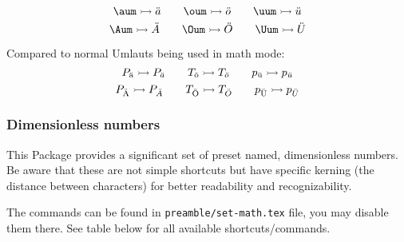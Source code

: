         \[
            \verb|\aum| \rightarrowtail  \aum \qquad
            \verb|\oum| \rightarrowtail  \oum \qquad
            \verb|\uum| \rightarrowtail  \uum
        \]
        \[
            \verb|\Aum| \rightarrowtail  \Aum \qquad
            \verb|\Oum| \rightarrowtail  \Oum \qquad
            \verb|\Uum| \rightarrowtail  \Uum
        \]

        Compared to normal Umlauts being used in math mode:
        \[
            P_{\ddot{\mathrm{a}}} \rightarrowtail P_{\ddot{a}} \qquad
            T_{\ddot{\mathrm{o}}} \rightarrowtail T_{\ddot{o}} \qquad
            p_{\ddot{\mathrm{u}}} \rightarrowtail p_{\ddot{u}}
        \]
        \[
            P_{\ddot{\mathrm{A}}} \rightarrowtail P_{\ddot{A}} \qquad
            T_{\ddot{\mathrm{O}}} \rightarrowtail T_{\ddot{O}} \qquad
            p_{\ddot{\mathrm{U}}} \rightarrowtail p_{\ddot{U}}
        \]


    \subsubsection{Dimensionless numbers}
        This Package provides a significant set of preset named, dimensionless numbers. Be aware that these are not simple shortcuts but have specific kerning (the distance between characters) for better readability and recognizability.

        The commands can be found in \texttt{preamble/set-math.tex} file, you may disable them there. See table below for all available shortcuts/commands.

